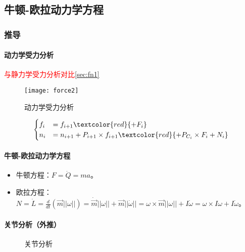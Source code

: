 \documentclass[
12pt, %
a4paper, 
oneside, %
headinclude,footinclude, %
]{scrartcl}
\begin{document}
\subsection{牛顿-欧拉动力学方程}
\subsubsection{推导}
\paragraph{动力学受力分析}\label{sec:fn2}
\textcolor{red}{与静力学受力分析对比}\ref{sec:fn1}

\begin{figure}[H]
\centering 
\texttt{[image: force2]} 
\caption[动力学受力分析]{动力学受力分析}
\end{figure}

$$
\begin{cases}
f_i &= f_{i + 1} \textcolor{red}{+ F_i} \\
n_i &= n_{i + 1} + P_{i + 1} \times f_{i + 1} \textcolor{red}{+ P_{C_i} \times F_i + N_i} \\
\end{cases}
$$
\paragraph{牛顿-欧拉动力学方程}
\begin{itemize}
\item 牛顿方程：$ F = \dot{Q} = ma $。
\item 欧拉方程：$ N = \dot{L} = \frac{d}{dt}(\vec{m}||\omega||) = \dot{\vec{m}}||\omega|| + \vec{m}||\dot{\omega}|| = \omega \times \vec{m}||\omega|| + I\dot{\omega} = \omega \times I\omega + I\dot{\omega} $。
\end{itemize}
\paragraph{关节分析（外推）}
\begin{figure}[H]
\centering
{} \quad
{}
\caption[关节分析]{关节分析}
\end{figure}
\end{document}
